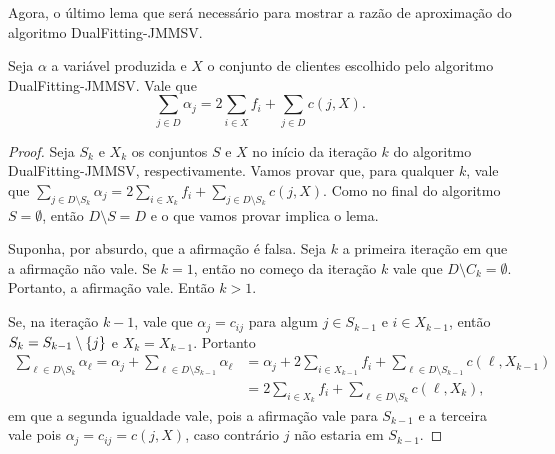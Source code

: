 Agora, o último lema que será necessário para mostrar a razão de aproximação do algoritmo {\sc DualFitting-JMMSV}.

\begin{lemma}
\label{greedy:5}
Seja $\alpha$ a variável produzida e $X$ o conjunto de clientes escolhido pelo algoritmo {\sc DualFitting-JMMSV}. Vale que 
\[ \sum_{j \in D} \alpha_j =  2\sum_{i \in X} f_i + \sum_{j \in D} c(j,X) .
\]
\end{lemma}

\begin{proof}
    Seja $S_k$ e $X_k$ os conjuntos $S$ e $X$ no início da iteração $k$ do algoritmo {\sc DualFitting-JMMSV}, respectivamente.
Vamos provar que, para qualquer $k$, vale que $\sum_{j \in D \setminus S_k} \alpha_j = 2 \sum_{i \in X_k} f_i + \sum_{j \in D \setminus S_k} c(j,X) $. Como no final do algoritmo $S = \emptyset$, então $D\setminus S = D$ e o que vamos provar implica o lema.

Suponha, por absurdo, que a afirmação é falsa. Seja $k$ a primeira iteração em que a afirmação não vale. Se $k=1$, então no começo da iteração $k$ vale que $D\setminus C_k = \emptyset$. Portanto, a afirmação vale. Então $k > 1$.

Se, na iteração $k-1$, vale que $\alpha_j = c_{ij}$ para algum $j \in S_{k-1}$ e $i \in X_{k-1}$, então $S_k = S_{k-1} \setminus \{j\}$ e $X_k = X_{k-1}$. Portanto 
\begin{subequations}
\begin{align*}
 \sum_{\ell \in D \setminus S_k} \alpha_\ell =  \alpha_j + \sum_{\ell \in D \setminus S_{k-1}} \alpha_\ell  &=  \alpha_j + 2 \sum_{i \in X_{k-1}} f_i +\sum_{\ell \in D\setminus  S_{k-1}}c(\ell,X_{k-1}) \\
 &= 2 \sum_{i \in X_{k}} f_i + \sum_{\ell \in D\setminus S_{k}}c(\ell,X_k) ,
\end{align*}
\end{subequations}
em que a segunda igualdade vale, pois a afirmação vale para $S_{k-1}$ e a terceira vale pois $\alpha_j = c_{ij} = c(j,X)$, caso contrário $j$ não estaria em $S_{k-1}$.


\end{proof}
